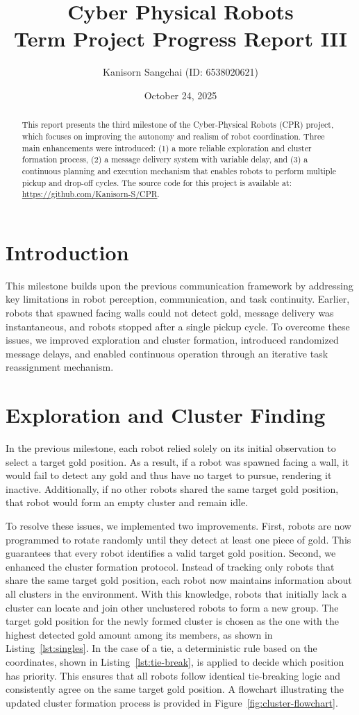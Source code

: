 \documentclass[12pt,a4paper]{article}
\title{Cyber Physical Robots\\Term Project Progress Report III}
\author{Kanisorn Sangchai (ID: 6538020621)}
\date{October 24, 2025}
\begin{document}
\maketitle

\begin{abstract}
This report presents the third milestone of the Cyber-Physical Robots (CPR) project, which focuses on improving the autonomy and realism of robot coordination. Three main enhancements were introduced: (1) a more reliable exploration and cluster formation process, (2) a message delivery system with variable delay, and (3) a continuous planning and execution mechanism that enables robots to perform multiple pickup and drop-off cycles. The source code for this project is available at: \url{https://github.com/Kanisorn-S/CPR}.
\end{abstract}

\section{Introduction}
This milestone builds upon the previous communication framework by addressing key limitations in robot perception, communication, and task continuity. Earlier, robots that spawned facing walls could not detect gold, message delivery was instantaneous, and robots stopped after a single pickup cycle. To overcome these issues, we improved exploration and cluster formation, introduced randomized message delays, and enabled continuous operation through an iterative task reassignment mechanism.

\section{Exploration and Cluster Finding}
In the previous milestone, each robot relied solely on its initial observation to select a target gold position. As a result, if a robot was spawned facing a wall, it would fail to detect any gold and thus have no target to pursue, rendering it inactive. Additionally, if no other robots shared the same target gold position, that robot would form an empty cluster and remain idle.

To resolve these issues, we implemented two improvements. First, robots are now programmed to rotate randomly until they detect at least one piece of gold. This guarantees that every robot identifies a valid target gold position. Second, we enhanced the cluster formation protocol. Instead of tracking only robots that share the same target gold position, each robot now maintains information about all clusters in the environment. With this knowledge, robots that initially lack a cluster can locate and join other unclustered robots to form a new group. The target gold position for the newly formed cluster is chosen as the one with the highest detected gold amount among its members, as shown in Listing~\ref{lst:singles}. In the case of a tie, a deterministic rule based on the coordinates, shown in Listing~\ref{lst:tie-break}, is applied to decide which position has priority. This ensures that all robots follow identical tie-breaking logic and consistently agree on the same target gold position. A flowchart illustrating the updated cluster formation process is provided in Figure~\ref{fig:cluster-flowchart}.
\end{document}
